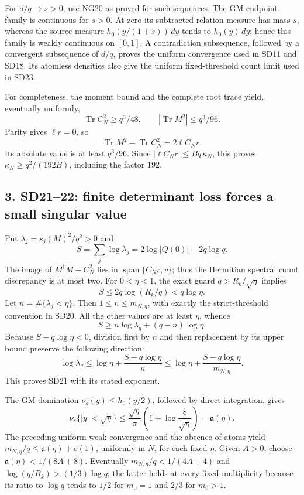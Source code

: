 For \(d/q\to s>0\), use NG20 as proved for such sequences. The GM endpoint family is continuous for \(s>0\). At zero its subtracted relation measure has mass \(s\), whereas the source measure \(h_0(y/(1+s))\,dy\) tends to \(h_0(y)\,dy\); hence this family is weakly continuous on \([0,1]\). A contradiction subsequence, followed by a convergent subsequence of \(d/q\), proves the uniform convergence used in SD11 and SD18. Its atomless densities also give the uniform fixed-threshold count limit used in SD23.

For completeness, the moment bound and the complete root trace yield, eventually uniformly, \[
\operatorname{Tr}C_N^2\ge q^3/48,\qquad
|\operatorname{Tr}M^2|\le q^3/96.
\] Parity gives \(\ell r=0\), so \[
\operatorname{Tr}M^2-\operatorname{Tr}C_N^2=2\ell C_Nr.
\] Its absolute value is at least \(q^3/96\). Since \(|\ell C_Nr|\le Bq\,\kappa_N\), this proves \(\kappa_N\ge q^2/(192B)\), including the factor \(192\).

\subsection{3. SD21--22: finite determinant loss forces a small singular value}\label{osdind:sd2122-finite-determinant-loss-forces-a-small-singular-value}

Put \(\lambda_j=s_j(M)^2/q^2>0\) and \[
S=\sum_j\log\lambda_j=2\log|Q(0)|-2q\log q.
\] The image of \(M^\dagger M-C_N^2\) lies in \(\operatorname{span}\{C_Nr,v\}\); thus the Hermitian spectral count discrepancy is at most two. For \(0<\eta<1\), the exact guard \(q>R_k/\sqrt\eta\) implies \[
S\le2q\log(R_k/q)<q\log\eta.
\] Let \(n=\#\{\lambda_j<\eta\}\). Then \(1\le n\le m_{N,\eta}\), with exactly the strict-threshold convention in SD20. All the other values are at least \(\eta\), whence \[
S\ge n\log\lambda_q+(q-n)\log\eta.
\] Because \(S-q\log\eta<0\), division first by \(n\) and then replacement by its upper bound preserve the following direction: \[
\log\lambda_q\le\log\eta+\frac{S-q\log\eta}{n}
\le\log\eta+\frac{S-q\log\eta}{m_{N,\eta}}.
\] This proves SD21 with its stated exponent.

The GM domination \(\nu_s(y)\le h_0(y/2)\), followed by direct integration, gives \[
\nu_s\{|y|<\sqrt\eta\}
\le \frac{\sqrt\eta}{\pi}
          \left(1+\log\frac8{\sqrt\eta}\right)=\mathfrak a(\eta).
\] The preceding uniform weak convergence and the absence of atoms yield \(m_{N,\eta}/q\le\mathfrak a(\eta)+o(1)\), uniformly in \(N\), for each fixed \(\eta\). Given \(A>0\), choose \(\mathfrak a(\eta)<1/(8A+8)\). Eventually \(m_{N,\eta}/q<1/(4A+4)\) and \(\log(q/R_k)>(1/3)\log q\); the latter holds at every fixed multiplicity because its ratio to \(\log q\) tends to \(1/2\) for \(m_0=1\) and \(2/3\) for \(m_0>1\).

